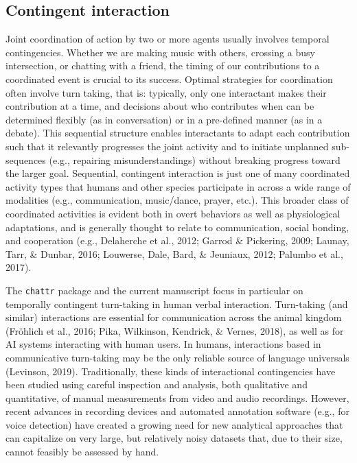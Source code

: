 \documentclass[10pt, letterpaper]{article}
\begin{document}
\hypertarget{contingent-interaction}{%
\subsection{Contingent interaction}\label{contingent-interaction}}

Joint coordination of action by two or more agents usually involves
temporal contingencies. Whether we are making music with others,
crossing a busy intersection, or chatting with a friend, the timing of
our contributions to a coordinated event is crucial to its success.
Optimal strategies for coordination often involve turn taking, that is:
typically, only one interactant makes their contribution at a time, and
decisions about who contributes when can be determined flexibly (as in
conversation) or in a pre-defined manner (as in a debate). This
sequential structure enables interactants to adapt each contribution
such that it relevantly progresses the joint activity and to initiate
unplanned sub-sequences (e.g., repairing misunderstandings) without
breaking progress toward the larger goal. Sequential, contingent
interaction is just one of many coordinated activity types that humans
and other species participate in across a wide range of modalities
(e.g., communication, music/dance, prayer, etc.). This broader class of
coordinated activities is evident both in overt behaviors as well as
physiological adaptations, and is generally thought to relate to
communication, social bonding, and cooperation (e.g., Delaherche et al.,
2012; Garrod \& Pickering, 2009; Launay, Tarr, \& Dunbar, 2016;
Louwerse, Dale, Bard, \& Jeuniaux, 2012; Palumbo et al., 2017).

The \texttt{chattr} package and the current manuscript focus in
particular on temporally contingent turn-taking in human verbal
interaction. Turn-taking (and similar) interactions are essential for
communication across the animal kingdom (Fröhlich et al., 2016; Pika,
Wilkinson, Kendrick, \& Vernes, 2018), as well as for AI systems
interacting with human users. In humans, interactions based in
communicative turn-taking may be the only reliable source of language
universals (Levinson, 2019). Traditionally, these kinds of interactional
contingencies have been studied using careful inspection and analysis,
both qualitative and quantitative, of manual measurements from video and
audio recordings. However, recent advances in recording devices and
automated annotation software (e.g., for voice detection) have created a
growing need for new analytical approaches that can capitalize on very
large, but relatively noisy datasets that, due to their size, cannot
feasibly be assessed by hand.
\end{document}
